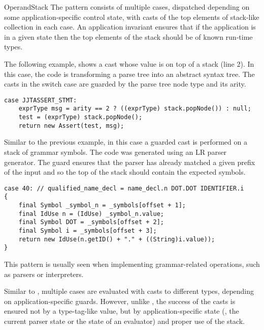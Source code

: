 \begin{pattern}{OperandStack}
The \thisp{} pattern consists of
multiple cases, dispatched depending on some application-specific control state, with
  casts of the top elements of stack-like collection in each case.
An application invariant ensures that if the application is in a given state
then the 
  top elements of the stack should be of known run-time types.

\instances{}
The following example,%
\def\urlvar{http://bit.ly/fabioz_Pydev_2HF6nrF}
shows a cast whose value is on top of a stack (line 2).
In this case, the code is transforming a parse tree into an abstract syntax
tree. The casts in the switch case are guarded by the parse tree node type and
its arity. 

\begin{verbatim}
case JJTASSERT_STMT:
    exprType msg = arity == 2 ? ((exprType) stack.popNode()) : null;
    test = (exprType) stack.popNode();
    return new Assert(test, msg);
\end{verbatim}

Similar to the previous example,
in this case%
\def\urlvar{http://bit.ly/Sable_soot_2MZLZ3m}
a guarded cast is performed on a stack of grammar symbols.
The code was generated using an LR parser
generator. The guard 
ensures that the parser has already matched a given prefix of the
input and so the top of the stack should contain the expected symbols.

\begin{verbatim}
case 40: // qualified_name_decl = name_decl.n DOT.DOT IDENTIFIER.i
{
    final Symbol _symbol_n = _symbols[offset + 1];
    final IdUse n = (IdUse) _symbol_n.value;
    final Symbol DOT = _symbols[offset + 2];
    final Symbol i = _symbols[offset + 3];
    return new IdUse(n.getID() + "." + ((String)i.value));
}
\end{verbatim}

\discussion{}
This pattern is usually seen when implementing grammar-related operations,
such as parsers or interpreters.

  Similar to , multiple cases are evaluated
  with casts to different types, depending on application-specific guards.
  However, unlike 
  , 
  the success of the casts is ensured not 
  by a type-tag-like value, but by application-specific state
  (\eg, the current parser state or the state of an evaluator)
  and proper use of the stack.

\end{pattern}
